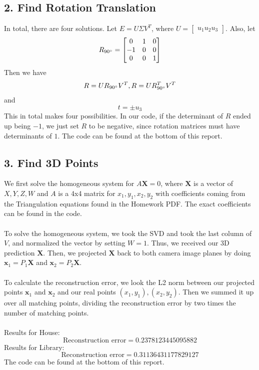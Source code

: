 \documentclass{article}\usepackage{amsmath,amssymb,amsthm,tikz,tkz-graph,color,chngpage,soul,hyperref,csquotes,graphicx,floatrow}\newcommand*{\QEDB}{\hfill\ensuremath{\square}}\newtheorem*{prop}{Proposition}\renewcommand{\theenumi}{\alph{enumi}}\usepackage[shortlabels]{enumitem}\usepackage[nobreak=true]{mdframed}\usetikzlibrary{matrix,calc}\MakeOuterQuote{"}\usepackage[margin=0.95in]{geometry} \newtheorem{theorem}{Theorem}
\begin{document}
\subsection*{2. Find Rotation Translation}
\begin{mdframed}
In total, there are four solutions. Let $ E = U \Sigma V^T$, where $ U =\begin{bmatrix} u_1 u_2 u_3 \end{bmatrix} $. Also, let 
\[ R_{90\degree} =  
\begin{bmatrix}
 0 & 1 & 0 \\
 -1 & 0 & 0 \\
 0 & 0 & 1 \\
\end{bmatrix}
\]
Then we have \[ R = UR_{90\degree}V^T, R = UR_{90\degree}^T V^T \] and \[ t = \pm u_3 \] This in total makes four possibilities. In our code, if the determinant of $ R $ ended up being $ -1 $, we just set $ R $ to be negative, since rotation matrices must have determinants of $1$. The code can be found at the bottom of this report. 

\end{mdframed}

\subsection*{3. Find 3D Points}
\begin{mdframed}
We first solve the homogeneous system for $ A\textbf{X} =0$, where $ \textbf{X} $ is a vector of $X, Y, Z, W$ and $ A $ is a 4x4 matrix for $ x_1, y_1, x_2, y_2 $ with coefficients coming from the Triangulation equations found in the Homework PDF. The exact coefficients can be found in the code. \\\\ To solve the homogeneous system, we took the SVD and took the last column of $ V $, and normalized the vector by setting $ W =1$. Thus, we received our 3D prediction $ \textbf{X} $. Then, we projected $ \textbf{X} $ back to both camera image planes by doing $ \textbf{x}_1 = P_1 \textbf{X} $ and $  \textbf{x}_2 = P_2 \textbf{X} $.\\\\ To calculate the reconstruction error, we look the L2 norm between our projected points $ \textbf{x}_1 $ and $ \textbf{x}_2 $ and our real points  $ (x_1, y_1), (x_2, y_2) $. Then we summed it up over all matching points, dividing the reconstruction error by two times the number of matching points.\\\\Results for House:
\[ \text{Reconstruction error} = 0.2378123445095882 \] Results for Library:
\[ \text{Reconstruction error} = 0.31136431177829127\] The code can be found at the bottom of this report. 
\end{mdframed}
\end{document}

